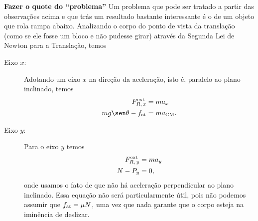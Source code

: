 \textbf{Fazer o quote do ``problema''}
Um problema que pode ser tratado a partir das observações acima e que trás um resultado bastante interessante é o de um objeto que rola rampa abaixo. Analizando o corpo do ponto de vista da translação (como se ele fosse um bloco e não pudesse girar) através da Segunda Lei de Newton para a Translação, temos
\begin{description}
    \item[Eixo $x$:] Adotando um eixo $x$ na direção da aceleração, isto é, paralelo ao plano inclinado, temos
    \begin{align}
        F_{R,\,x}^{\rm{ext}} &= ma_x \\
        mg \sen\theta - f_{\rm{at}} &= m a_{\textrm{CM}}.
    \end{align}

    \item[Eixo $y$:] Para o eixo $y$ temos
    \begin{align}
        F_{R,\,y}^{\rm{ext}} &= m a_y \\
        N - P_y &= 0,
    \end{align}
    onde usamos o fato de que não há aceleração perpendicular ao plano inclinado. Essa equação não será particularmente útil, pois não podemos assumir que $f_{\rm{at}} = \mu N$, uma vez que nada garante que o corpo esteja na iminência de deslizar.
\end{description}

